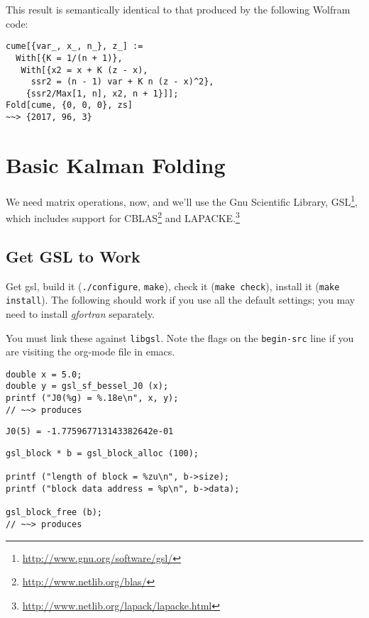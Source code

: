 \documentclass[10pt,oneside,x11names]{article}
\begin{document}
This result is semantically identical to that produced by the following Wolfram
code:

\begin{verbatim}
cume[{var_, x_, n_}, z_] :=
  With[{K = 1/(n + 1)},
   With[{x2 = x + K (z - x),
     ssr2 = (n - 1) var + K n (z - x)^2},
    {ssr2/Max[1, n], x2, n + 1}]];
Fold[cume, {0, 0, 0}, zs]
~~> {2017, 96, 3}
\end{verbatim}

\section{Basic Kalman Folding}
\label{sec:orgheadline20}

We need matrix operations, now, and we'll use the Gnu Scientific Library,
GSL\footnote{\url{http://www.gnu.org/software/gsl/}}, which includes support for CBLAS\footnote{\url{http://www.netlib.org/blas/}} and LAPACKE.\footnote{\url{http://www.netlib.org/lapack/lapacke.html}}

\subsection{Get GSL to Work}
\label{sec:orgheadline16}

Get gsl, build it (\texttt{./configure}, \texttt{make}),
check it (\texttt{make check}), install it (\texttt{make install}). The following should work
if you use all the default settings; you may need to install \emph{gfortran}
separately. 

You must link these against \texttt{libgsl}. Note the flags on the
\texttt{begin-src} line if you are visiting the org-mode file in emacs.


\begin{verbatim}
double x = 5.0;
double y = gsl_sf_bessel_J0 (x);
printf ("J0(%g) = %.18e\n", x, y);
// ~~> produces
\end{verbatim}

\begin{verbatim}
J0(5) = -1.775967713143382642e-01
\end{verbatim}

\begin{verbatim}
gsl_block * b = gsl_block_alloc (100);

printf ("length of block = %zu\n", b->size);
printf ("block data address = %p\n", b->data);

gsl_block_free (b);
// ~~> produces
\end{verbatim}
\end{document}
